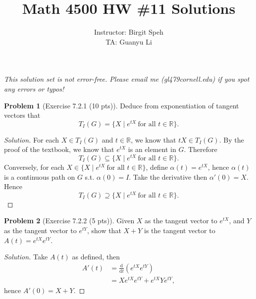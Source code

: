 \documentclass{article}
\title{Math 4500 HW \#11 Solutions}
\author{Instructor: Birgit Speh\\ TA: Guanyu Li}
\date{}
\theoremstyle{definition}
\newtheorem{problem}{Problem}
\theoremstyle{plain}
\begin{document}
\maketitle\par

\emph{This solution set is not error-free. Please email me (gl479\MVAt cornell.edu) if you spot any errors or typos!}

\begin{problem}[Exercise 7.2.1 (10 pts)]
Deduce from exponentiation of tangent vectors that
\begin{displaymath}
T_I(G)=\{X\mid e^{tX}~\text{for all }t\in\mathbb{R}\}.
\end{displaymath}
\end{problem}
\begin{adjustwidth}{0.7cm}{}
\color{blue}
\begin{proof}[Solution]
For each $X\in T_I(G)$ and $t\in\mathbb{R}$, we know that $tX\in T_I(G)$. By the proof of the textbook, we know that $e^{tX}$ is an element in $G$. Therefore
\begin{displaymath}
T_I(G)\subseteq\{X\mid e^{tX}~\text{for all }t\in\mathbb{R}\}.
\end{displaymath}
Conversely, for each $X\in\{X\mid e^{tX}~\text{for all }t\in\mathbb{R}\}$, define $\alpha(t)=e^{tX}$, hence $\alpha(t)$ is a continuous path on $G$ s.t. $\alpha(0)=I$. Take the derivative then $\alpha'(0)=X$. Hence
\begin{displaymath}
T_I(G)\supseteq\{X\mid e^{tX}~\text{for all }t\in\mathbb{R}\}.
\end{displaymath}
\color{black}
\end{proof}
\end{adjustwidth}

\begin{problem}[Exercise 7.2.2 (5 pts)]
Given $X$ as the tangent vector to $e^{tX}$, and $Y$ as the tangent vector to $e^{tY}$, show that $X+Y$ is the tangent vector to $A(t)=e^{tX}e^{tY}$.
\end{problem}
\begin{adjustwidth}{0.7cm}{}
\color{blue}
\begin{proof}[Solution]
Take $A(t)$ as defined, then
\begin{align*}
A'(t)&=\frac{\mathrm{d}}{\mathrm{d}t}(e^{tX}e^{tY})\\
&=Xe^{tX}e^{tY}+e^{tX}Ye^{tY},
\end{align*}
hence $A'(0)=X+Y$.
\color{black}
\end{proof}
\end{adjustwidth}
\end{document}
